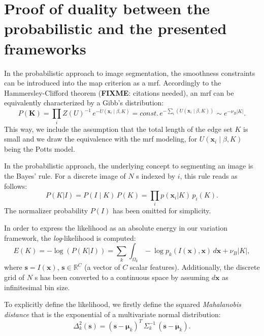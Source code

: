 \onecolumn
\appendix

\section{Proof of duality between the probabilistic and the presented frameworks}

In the probabilistic approach to image segmentation, the smoothness constraints
can be introduced into the \gls{map} criterion as a \gls{mrf}. Accordingly to the
Hammersley-Clifford theorem (\textbf{FIXME}: citations needed), an \gls{mrf} can
be equivalently characterized by a Gibb's distribution:
\begin{equation}
P(\mathbf{K})=\underset{i}{\prod} Z(U)^{-1}\,e^{-U(\mathbf{x}_i \mid \beta,K)} = \mathit{const.}\,e^{- \sum\limits_i \left( U(\mathbf{x}_i \mid \beta,K) \right) } \sim e^{-\nu_B \left| K \right| }.
\end{equation}
This way, we include the assumption that the total length of the edge set $K$ is small
and we draw the equivalence with the \gls{mrf} modeling, for $U(\mathbf{x}_i \mid \beta,K)$
being the Potts model.

In the probabilistic approach, the underlying concept to segmenting an image is the
Bayes' rule. For a discrete image of $N$ s indexed by $i$, this rule reads as
follows:
\begin{equation}
P(K|I)=P(I \mid K)\, P(K)=\underset{i}{\prod} p (\mathbf{x}_i | K ) \, p_i(K).
\end{equation}
The normalizer probability $P(I)$ has been omitted for simplicity.

In order to express the likelihood as an absolute energy in our variation framework,
the \textit{log}-likelihood is computed:
\begin{equation}
E(K)= -\log( P(K|I) ) = \sum\limits_k \int_{\Omega_k} -\log p_k(I(\mathbf{x}),\mathbf{x}) \,d\mathbf{x}+\nu_B \left|K\right|,
\end{equation}
where $\mathbf{s} = I(\mathbf{x})$, $\mathbf{s} \in \mathbb{R}^C$ (a vector of $C$ scalar features).
Additionally, the discrete grid of $N$ s has been converted to a continuous space by assuming
$d\mathbf{x}$ as infinitesimal bin size.

To explicitly define the likelihood, we firstly define the squared \textit{Mahalanobis distance} that
is the exponential of a multivariate normal distribution:
\begin{equation}
\Delta^2_k (\mathbf{s}) = (\mathbf{s} - \boldsymbol{\mu}_k)^T \, \Sigma^{-1}_k \, (\mathbf{s} - \boldsymbol{\mu}_k).
\end{equation}

